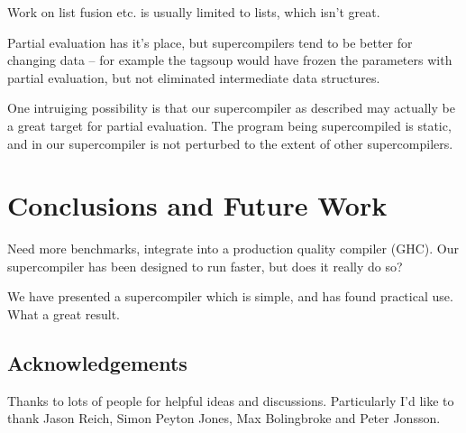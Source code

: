 \documentclass{sigplanconf}
\begin{document}
Work on list fusion etc. is usually limited to lists, which isn't great.

Partial evaluation has it's place, but supercompilers tend to be better for changing data -- for example the tagsoup would have frozen the parameters with partial evaluation, but not eliminated intermediate data structures.

One intruiging possibility is that our supercompiler as described may actually be a great target for partial evaluation. The program being supercompiled is static, and in our supercompiler is not perturbed to the extent of other supercompilers.

\section{Conclusions and Future Work}

Need more benchmarks, integrate into a production quality compiler (GHC). Our supercompiler has been designed to run faster, but does it really do so?

We have presented a supercompiler which is simple, and has found practical use. What a great result.


\subsection{Acknowledgements}

Thanks to lots of people for helpful ideas and discussions. Particularly I'd like to thank Jason Reich, Simon Peyton Jones, Max Bolingbroke and Peter Jonsson.



\end{document}
